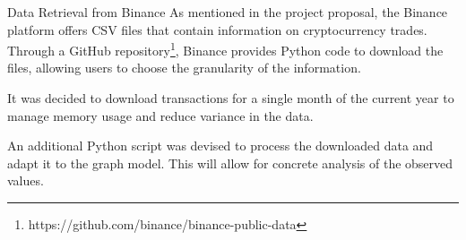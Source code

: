 \begin{projsection}{Data Retrieval from Binance}
	As mentioned in the project proposal, the Binance platform offers CSV files that contain information on cryptocurrency trades.
	Through a GitHub repository\footnote{https://github.com/binance/binance-public-data}, Binance provides Python code to download the files, allowing users to choose the granularity of the information.
	
	It was decided to download transactions for a single month of the current year to manage memory usage and reduce variance in the data.
	
	An additional Python script was devised to process the downloaded data and adapt it to the graph model. This will allow for concrete analysis of the observed values.
\end{projsection}


	

